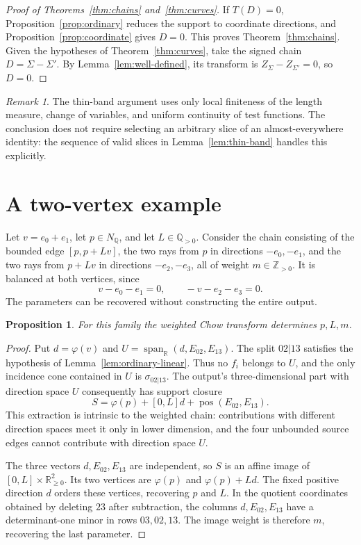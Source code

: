 \documentclass[11pt]{article}
\newtheorem{proposition}[theorem]{Proposition}
\theoremstyle{definition}
\theoremstyle{remark}
\newtheorem{remark}[theorem]{Remark}
\newcommand{\R}{\mathbb R}
\newcommand{\Q}{\mathbb Q}
\newcommand{\Z}{\mathbb Z}
\newcommand{\pos}{\operatorname{pos}}
\newcommand{\Span}{\operatorname{span}_{\R}}
\begin{document}
\begin{proof}[Proof of Theorems~\ref{thm:chains} and~\ref{thm:curves}]
If $T(D)=0$, Proposition~\ref{prop:ordinary} reduces the support to
coordinate directions, and Proposition~\ref{prop:coordinate} gives
$D=0$. This proves Theorem~\ref{thm:chains}. Given the hypotheses of
Theorem~\ref{thm:curves}, take the signed chain $D=\Sigma-\Sigma'$.
By Lemma~\ref{lem:well-defined}, its transform is
$Z_\Sigma-Z_{\Sigma'}=0$, so $D=0$.
\end{proof}

\begin{remark}
The thin-band argument uses only local finiteness of the length measure,
change of variables, and uniform continuity of test functions.
The conclusion does not require selecting an arbitrary slice of an
almost-everywhere identity: the sequence of valid slices in
Lemma~\ref{lem:thin-band} handles this explicitly.
\end{remark}

\section{A two-vertex example}

Let $v=e_0+e_1$, let $p\in N_{\Q}$, and let $L\in\Q_{>0}$.
Consider the chain consisting of the bounded edge $[p,p+Lv]$, the two
rays from $p$ in directions $-e_0,-e_1$, and the two rays from $p+Lv$
in directions $-e_2,-e_3$, all of weight $m\in\Z_{>0}$.
It is balanced at both vertices, since
\[
 v-e_0-e_1=0,\qquad -v-e_2-e_3=0.
\]
The parameters can be recovered without constructing the entire output.

\begin{proposition}\label{prop:example}
For this family the weighted Chow transform determines $p,L,m$.
\end{proposition}

\begin{proof}
Put $d=\varphi(v)$ and $U=\Span(d,E_{02},E_{13})$.
The split $02|13$ satisfies the hypothesis of
Lemma~\ref{lem:ordinary-linear}. Thus no $f_i$ belongs to $U$,
and the only incidence cone contained in $U$ is
$\sigma_{02|13}$. The output's three-dimensional part with direction
space $U$ consequently has support closure
\[
 S=\varphi(p)+[0,L]d+\pos(E_{02},E_{13}).
\]
This extraction is intrinsic to the weighted chain: contributions with
different direction spaces meet it only in lower dimension, and the
four unbounded source edges cannot contribute with direction space $U$.

The three vectors $d,E_{02},E_{13}$ are independent, so $S$ is an
affine image of $[0,L]\times\R_{\ge0}^2$. Its two vertices are
$\varphi(p)$ and $\varphi(p)+Ld$. The fixed positive direction $d$
orders these vertices, recovering $p$ and $L$. In the quotient
coordinates obtained by deleting $23$ after subtraction, the columns
$d,E_{02},E_{13}$ have a determinant-one minor in rows $03,02,13$.
The image weight is therefore $m$, recovering the last parameter.
\end{proof}
\end{document}
